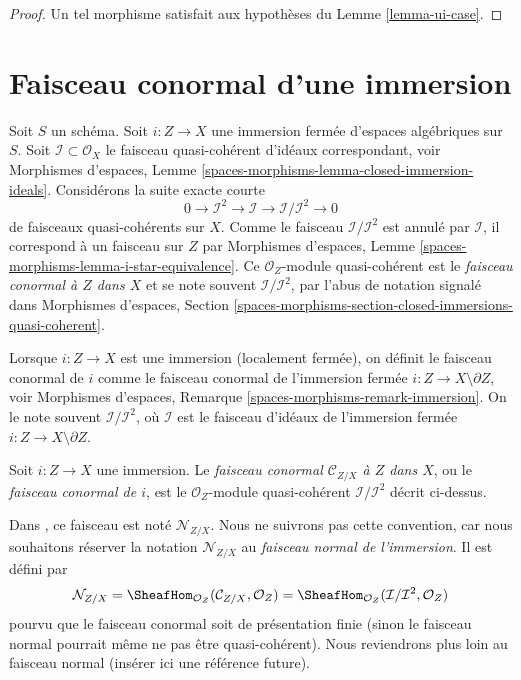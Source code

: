 \begin{proof}
Un tel morphisme satisfait aux hypothèses du Lemme \ref{lemma-ui-case}.
\end{proof}







\section{Faisceau conormal d'une immersion}
\label{section-conormal-sheaf}

\noindent
Soit $S$ un schéma. Soit $i : Z \to X$ une immersion fermée d'espaces
algébriques sur $S$. Soit $\mathcal{I} \subset \mathcal{O}_X$ le faisceau
quasi-cohérent d'idéaux correspondant, voir
Morphismes d'espaces,
Lemme \ref{spaces-morphisms-lemma-closed-immersion-ideals}.
Considérons la suite exacte courte
$$
0 \to \mathcal{I}^2 \to \mathcal{I} \to \mathcal{I}/\mathcal{I}^2 \to 0
$$
de faisceaux quasi-cohérents sur $X$. Comme le faisceau $\mathcal{I}/\mathcal{I}^2$
est annulé par $\mathcal{I}$, il correspond à un faisceau sur $Z$ par
Morphismes d'espaces, Lemme \ref{spaces-morphisms-lemma-i-star-equivalence}.
Ce $\mathcal{O}_Z$-module quasi-cohérent est le
{\it faisceau conormal à $Z$ dans $X$} et se note souvent
$\mathcal{I}/\mathcal{I}^2$, par l'abus de notation signalé dans
Morphismes d'espaces,
Section \ref{spaces-morphisms-section-closed-immersions-quasi-coherent}.

\medskip\noindent
Lorsque $i : Z \to X$ est une immersion (localement fermée), on définit le
faisceau conormal de $i$ comme le faisceau conormal de
l'immersion fermée $i : Z \to X \setminus \partial Z$, voir
Morphismes d'espaces, Remarque \ref{spaces-morphisms-remark-immersion}.
On le note souvent
$\mathcal{I}/\mathcal{I}^2$, où $\mathcal{I}$ est le faisceau d'idéaux
de l'immersion fermée $i : Z \to X \setminus \partial Z$.

\begin{definition}
\label{definition-conormal-sheaf}
Soit $i : Z \to X$ une immersion. Le {\it faisceau conormal
$\mathcal{C}_{Z/X}$ à $Z$ dans $X$}, ou le {\it faisceau conormal de $i$},
est le $\mathcal{O}_Z$-module quasi-cohérent $\mathcal{I}/\mathcal{I}^2$
décrit ci-dessus.
\end{definition}

\noindent
Dans \cite[IV Définition 16.1.2]{EGA}, ce faisceau est noté
$\mathcal{N}_{Z/X}$. Nous ne suivrons pas cette convention, car nous souhaitons
réserver la notation $\mathcal{N}_{Z/X}$
au {\it faisceau normal de l'immersion}. Il est défini par
$$
\mathcal{N}_{Z/X} =
\SheafHom_{\mathcal{O}_Z}(\mathcal{C}_{Z/X}, \mathcal{O}_Z) =
\SheafHom_{\mathcal{O}_Z}(\mathcal{I}/\mathcal{I}^2, \mathcal{O}_Z)
$$
pourvu que le faisceau conormal soit de présentation finie (sinon le
faisceau normal pourrait même ne pas être quasi-cohérent). Nous reviendrons plus loin au
faisceau normal (insérer ici une référence future).


